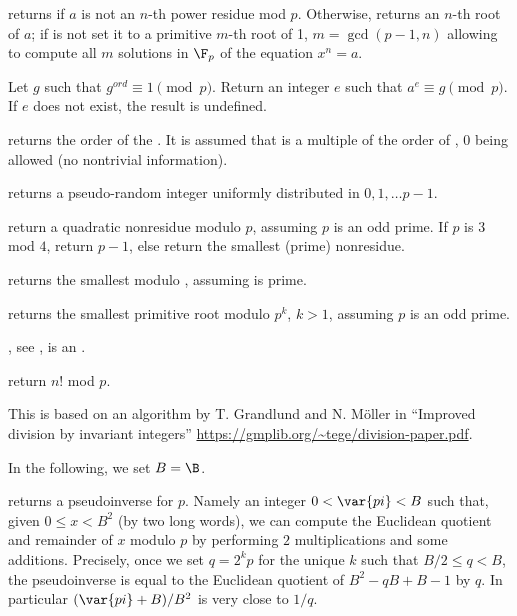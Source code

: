 returns  if $a$ is not an $n$-th power residue mod $p$.
Otherwise, returns an $n$-th root of $a$; if  is not 
set it to a primitive $m$-th root of 1, $m = \gcd(p-1,n)$ allowing to compute
all $m$ solutions in $\F_p$ of the equation $x^n = a$.

 Let $g$ such that
$g^{ord} \equiv 1 \pmod{p}$. Return an integer $e$ such that
$a^e \equiv g \pmod{p}$. If $e$ does not exist, the result is undefined.

 returns the order of the
 . It is assumed that  is a multiple of the order of
, $0$ being allowed (no nontrivial information).

 returns a pseudo-random integer uniformly
distributed in $0, 1, \dots p-1$.

 return a quadratic nonresidue modulo $p$,
assuming $p$ is an odd prime. If $p$ is $3$ mod $4$, return $p-1$, else
return the smallest (prime) nonresidue.

 returns the smallest 
modulo , assuming  is prime.

 returns the smallest primitive root modulo
$p^k$, $k > 1$, assuming $p$ is an odd prime.

, see ,
 is an .

 return $n!$ mod $p$.


This is based on an algorithm by T. Grandlund and N. M\"{o}ller in
``Improved division by invariant integers''
\url{https://gmplib.org/~tege/division-paper.pdf}.

In the following, we set $B=\B$.

 returns a pseudoinverse  for $p$.
Namely an integer $0 < \var{pi} < B$ such that, given $0 \leq x < B^2$ (by
two long words), we can compute the Euclidean quotient and remainder of $x$
modulo $p$ by performing $2$ multiplications and some additions. Precisely,
once we set $q = 2^k p$ for the unique $k$ such that $B/2 \leq q < B$, the
pseudoinverse  is equal to the Euclidean quotient of $B^2 - qB + B-1$
by $q$. In particular $(\var{pi} + B) / B^2$ is very close to $1/q$.

